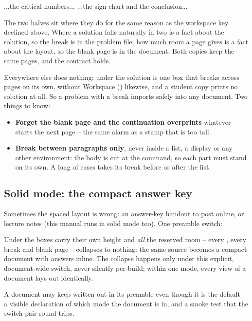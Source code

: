 \begin{manexsource}
\begin{solution}[notitle]
  ...the critical numbers...
  \solutionbreak
  ...the sign chart and the conclusion...
\end{solution}

\workspace*
\FreshPage[blank]   %
\end{manexsource}

The two halves sit where they do for the same reason as the workspace key declined above.
Where a solution falls naturally in two is a fact about the solution, so the break is in the problem file; how much room a page gives is a fact about the layout, so the blank page is in the document.
Both copies keep the same pages, and the contract holds.

Everywhere else  does nothing: under  the solution is one box that breaks across pages on its own, without Workspace () likewise, and a student copy prints no solution at all.
So a problem with a break imports safely into any document.
Two things to know:
\begin{itemize}
  \item \textbf{Forget the blank page and the continuation overprints} whatever starts the next page -- the same alarm as a stamp that is too tall.
  \item \textbf{Break between paragraphs only}, never inside a list, a display or any other environment: the body is cut at the command, so each part must stand on its own.
    A long  of cases takes its break before or after the list.
\end{itemize}

\subsection{Solid mode: the compact answer key}

Sometimes the spaced layout is wrong: an answer-key handout to post online,
or lecture notes (this manual runs in solid mode too). One preamble switch:

\begin{manexsource}
\collapseworkspace  %
\preserveworkspace  %
\end{manexsource}

Under  the boxes carry their own height and \emph{all} the
reserved room -- every , every  break and blank
page -- collapses to nothing: the same source becomes a compact document
with answers inline. The collapse happens only under this explicit,
document-wide switch, never silently per-build; within one mode, every view
of a document lays out identically.

A document may keep  written out in its preamble even
though it is the default -- a visible declaration of which mode the document
is in, and a smoke test that the switch pair round-trips.
